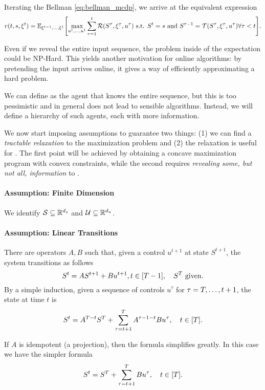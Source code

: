 \documentclass[letterpaper,11pt]{article}
\begin{document}
Iterating the Bellman \cref{eq:bellman_mcdp}, we arrive at the equivalent expression 
\begin{equation}
v(t,s,\xit) = \E_{\xi^{t-1},\ldots,\xi^1}\brk*{\max_{u^t,\ldots,u^1}\sum_{\tau=1}^t\Re(S^\tau,\xi^\tau,u^\tau) \text{ s.t. }  S^t=s \text{ and } S^{\tau-1}=\Tr(S^\tau,\xi^\tau,u^\tau) \forall \tau<t }.
\end{equation}

Even if we reveal the entire input sequence, the problem inside of the expectation could be NP-Hard.
This yields another motivation for online algorithms: by pretending the input arrives online, it gives a way of efficiently approximating a hard problem.

We can define \off as the agent that knows the entire sequence, but this is too pessimistic and in general does not lead to sensible algorithms.
Instead, we will define a hierarchy of such agents, each with more information.

We now start imposing assumptions to guarantee two things: (1) we can find a \emph{tractable relaxation} to the maximization problem and (2) the relaxation is useful for \onl.
The first point will be achieved by obtaining a concave maximization program with convex constraints, while the second requires \emph{revealing some, but not all, information} to \off.

\paragraph{Assumption: Finite Dimension}
We identify $\mathcal{S}\subseteq \mathbb{R}^{d_s}$ and $\mathcal{U}\subseteq\mathbb{R}^{d_u}$.

\paragraph{Assumption: Linear Transitions}
There are operators $A,B$ such that, given a control $u^{t+1}$ at state $S^{t+1}$, the system transitions as follows
\[
S^{t} = AS^{t+1} + Bu^{t+1}, t\in[T-1], \quad 
S^T \text{ given}.
\]
By a simple induction, given a sequence of controls $u^\tau$ for $\tau=T,\ldots,t+1$, the state at time $t$ is
\[
S^t = A^{T-t}S^T + \sum_{\tau=t+1}^T A^{\tau-1-t}Bu^\tau, \quad t\in[T].
\]

If $A$ is idempotent (a projection), then the formula simplifies greatly.
In this case we have the simpler formula
\begin{equation}\label{eq:linear_state}
S^t = S^T + \sum_{\tau=t+1}^T Bu^\tau, \quad t\in[T].
\end{equation}
\end{document}
